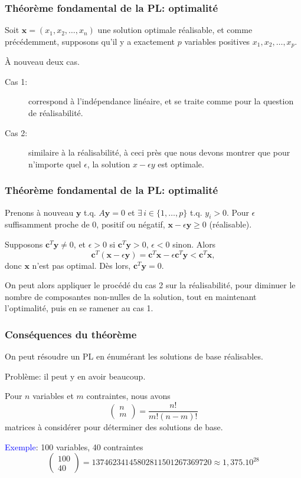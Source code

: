 \documentclass[usepdftitle=false]{beamer}
\def\bc{\boldsymbol{c}}
\def\bx{\boldsymbol{x}}
\def\by{\boldsymbol{y}}
\begin{document}
\begin{frame}
\frametitle{Théorème fondamental de la PL: optimalité}

Soit $\bx = (x_1, x_2, \ldots, x_n)$ une solution optimale réalisable, et comme précédemment, supposons qu'il y a exactement $p$ variables positives $x_1, x_2, \ldots, x_p$.

\mbox{}

À nouveau deux cas.
\begin{description}
\item[Cas 1:] correspond à l'indépendance linéaire, et se traite comme pour la question de réalisabilité.
\item[Cas 2:]
similaire à la réalisabilité, à ceci près que nous devons montrer que pour n'importe quel $\epsilon$, la solution $x-\epsilon y$ est optimale.
\end{description}

\end{frame}

\begin{frame}
\frametitle{Théorème fondamental de la PL: optimalité}

Prenons à nouveau $\by$ t.q. $A\by = 0$ et $\exists\, i \in \{1,\ldots,p\}$ t.q. $y_i > 0$.
Pour $\epsilon$ suffisamment proche de 0, positif ou négatif, $\bx - \epsilon \by \geq 0$ (réalisable).

\mbox{}

Supposons $\bc^T\by \ne 0$, et $\epsilon > 0$ si $\bc^T\by > 0$, $\epsilon < 0$ sinon. Alors
$$
\bc^T(\bx - \epsilon \by) = \bc^T \bx - \epsilon \bc^T\by < \bc^T \bx,
$$
donc $\bx$ n'est pas optimal.
Dès lors, $\bc^T\by = 0$.

\mbox{}

On peut alors appliquer le procédé du cas 2 sur la réalisabilité, pour diminuer le nombre de composantes non-nulles de la solution, tout en maintenant l'optimalité, puis en se ramener au cas 1.

\end{frame}

\begin{frame}
\frametitle{Conséquences du théorème}

On peut résoudre un PL en énumérant les solutions de base réalisables.

Problème: il peut y en avoir beaucoup.

Pour $n$ variables et $m$ contraintes, nous avons
\[
\begin{pmatrix}
n \\ m
\end{pmatrix}
= \frac{n!}{m!(n-m)!}
\]
matrices à considérer pour déterminer des solutions de base.

\mbox{}

\textcolor{blue}{Exemple}: 100 variables, 40 contraintes
\[
\begin{pmatrix}
100 \\ 40
\end{pmatrix}
= 13746234145802811501267369720 \approx 1,375.10^{28}
\]

\end{frame}
\end{document}
